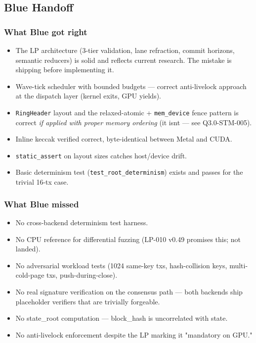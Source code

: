 \documentclass[
]{article}
\providecommand{\tightlist}{%
  \setlength{\itemsep}{0pt}\setlength{\parskip}{0pt}}
\begin{document}
\subsection{Blue Handoff}\label{blue-handoff}

\subsubsection{What Blue got right}\label{what-blue-got-right}

\begin{itemize}
\tightlist
\item
  The LP architecture (3-tier validation, lane refraction, commit
  horizons, semantic reducers) is solid and reflects current research.
  The mistake is shipping before implementing it.
\item
  Wave-tick scheduler with bounded budgets --- correct anti-livelock
  approach at the dispatch layer (kernel exits, GPU yields).
\item
  \texttt{RingHeader} layout and the relaxed-atomic +
  \texttt{mem\_device} fence pattern is correct \emph{if applied with
  proper memory ordering} (it isn\textquotesingle t --- see
  Q3.0-STM-005).
\item
  Inline keccak verified correct, byte-identical between Metal and CUDA.
\item
  \texttt{static\_assert} on layout sizes catches host/device drift.
\item
  Basic determinism test (\texttt{test\_root\_determinism}) exists and
  passes for the trivial 16-tx case.
\end{itemize}

\subsubsection{What Blue missed}\label{what-blue-missed}

\begin{itemize}
\tightlist
\item
  No cross-backend determinism test harness.
\item
  No CPU reference for differential fuzzing (LP-010 v0.49 promises this;
  not landed).
\item
  No adversarial workload tests (1024 same-key txs, hash-collision keys,
  multi-cold-page txs, push-during-close).
\item
  No real signature verification on the consensus path --- both backends
  ship placeholder verifiers that are trivially forgeable.
\item
  No state\_root computation --- block\_hash is uncorrelated with state.
\item
  No anti-livelock enforcement despite the LP marking it "mandatory on
  GPU."
\end{itemize}
\end{document}
